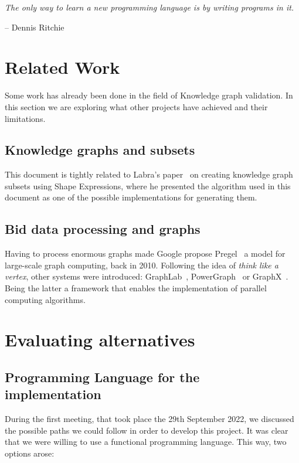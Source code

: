 \epigraph{\textit{The only way to learn a new programming language is by writing programs in it.}}{-- \textup{Dennis Ritchie}}

\section{Related Work}

Some work has already been done in the field of Knowledge graph validation. In this section we are exploring what other projects have achieved and their limitations.

\subsection{Knowledge graphs and subsets}

This document is tightly related to Labra's paper~\cite{https://doi.org/10.48550/arxiv.2110.11709} on creating knowledge graph subsets using Shape Expressions, where he presented the algorithm used in this document as one of the possible implementations for generating them.

\subsection{Bid data processing and graphs}

Having to process enormous graphs made Google propose Pregel~\cite{10.1145/1807167.1807184} a model for large-scale graph computing, back in 2010. Following the idea of \textit{think like a vertex}, other systems were introduced: GraphLab~\cite{10.14778/2212351.2212354}, PowerGraph~\cite{180251} or GraphX~\cite{186216}. Being the latter a framework that enables the implementation of parallel computing algorithms.

\section{Evaluating alternatives}

\subsection{Programming Language for the implementation}

During the first meeting, that took place the 29th September 2022, we discussed the possible paths we could follow in order to develop this project. It was clear that we were willing to use a functional programming language. This way, two options arose:

